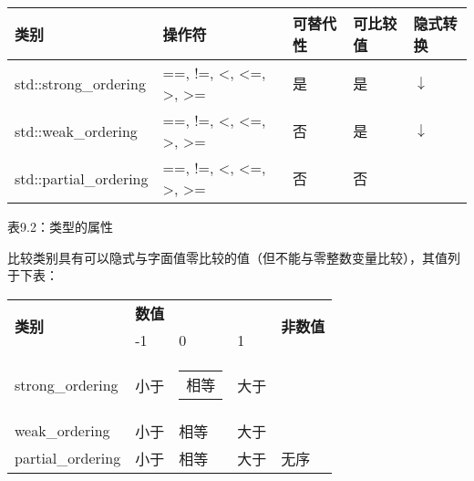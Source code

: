 \begin{longtable}{|l|l|l|l|l|}
\hline
\textbf{类别} & \textbf{操作符} & \textbf{可替代性} & \textbf{可比较值} & \textbf{隐式转换} \\ \hline
\endfirsthead
%
\endhead
%
std::strong\_ordering  & ==, !=, \textless{}, \textless{}=, \textgreater{}, \textgreater{}= & 是 & 是 & $\downarrow$ \\ \hline
std::weak\_ordering    & ==, !=, \textless{}, \textless{}=, \textgreater{}, \textgreater{}= & 否  & 是 & $\downarrow$ \\ \hline
std::partial\_ordering & ==, !=, \textless{}, \textless{}=, \textgreater{}, \textgreater{}= & 否  & 否  &              \\ \hline
\end{longtable}

\begin{center}
表9.2：类型的属性
\end{center}

比较类别具有可以隐式与字面值零比较的值（但不能与零整数变量比较），其值列于下表：

\begin{longtable}{|l|lll|l|}
\hline
\multirow{2}{*}{\textbf{类别}} &
\multicolumn{3}{l|}{\textbf{数值}} &
\multirow{2}{*}{\textbf{非数值}} \\ \cline{2-4}
& \multicolumn{1}{l|}{-1}   & \multicolumn{1}{l|}{0}          & 1       &           \\ \hline
\endfirsthead
%
\endhead
%
strong\_ordering &
\multicolumn{1}{l|}{小于} &
\multicolumn{1}{l|}{\begin{tabular}[c]{@{}l@{}}相等\end{tabular}} &
大于 &
\\ \hline
weak\_ordering    & \multicolumn{1}{l|}{小于} & \multicolumn{1}{l|}{相等} & 大于 &           \\ \hline
partial\_ordering & \multicolumn{1}{l|}{小于} & \multicolumn{1}{l|}{相等} & 大于 & 无序 \\ \hline
\end{longtable}

